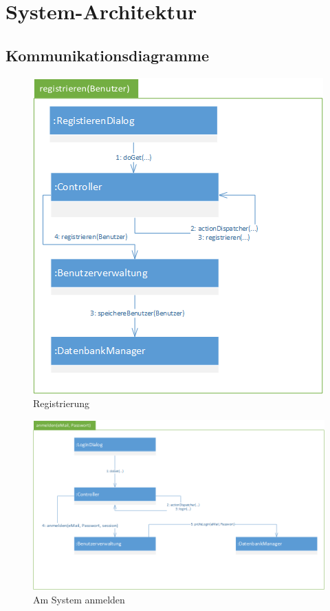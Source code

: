 \documentclass[12pt]{scrreprt}
\begin{document}
\chapter{System-Architektur}
\section{Kommunikationsdiagramme}
\begin{figure}[h]
	\centering
	\includegraphics[width=0.7\linewidth]{Bilder/Kommunikationsdiagramme/registrieren}
	\caption{Registrierung}
	\label{Registrierung}
\end{figure}

\begin{figure}[h]
\centering
\includegraphics[width=\linewidth]{Bilder/Kommunikationsdiagramme/anmelden}
\caption{Am System anmelden}
\label{Am System anmelden}
\end{figure}
\end{document}
